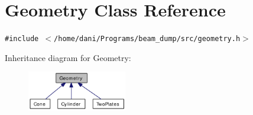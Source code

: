 \hypertarget{classGeometry}{
\section{Geometry Class Reference}
\label{classGeometry}
}
{\tt \#include $<$/home/dani/Programs/beam\_\-dump/src/geometry.h$>$}

Inheritance diagram for Geometry:\nopagebreak
\begin{figure}[H]
\begin{center}
\leavevmode
\includegraphics[width=123pt]{classGeometry__inherit__graph}
\end{center}
\end{figure}
